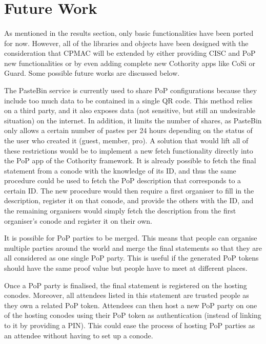\section{Future Work}

\paragraph{}
As mentioned in the results section, only basic functionalities have been ported for now. However, all of the libraries and objects have been designed with the consideration that CPMAC will be extended by either providing CISC and PoP new functionalities or by even adding complete new Cothority apps like CoSi or Guard. Some possible future works are discussed below.

\begin{description}[style=nextline]
\item[Replacing PasteBin] The PasteBin service is currently used to share PoP configurations because they include too much data to be contained in a single QR code. This method relies on a third party, and it also exposes data (not sensitive, but still an undesirable situation) on the internet. In addition, it limits the number of shares, as PasteBin only allows a certain number of pastes per 24 hours depending on the status of the user who created it (guest, member, pro). A solution that would lift all of these restrictions would be to implement a new fetch functionality directly into the PoP app of the Cothority framework. It is already possible to fetch the final statement from a conode with the knowledge of its ID, and thus the same procedure could be used to fetch the PoP description that corresponds to a certain ID. The new procedure would then require a first organiser to fill in the description, register it on that conode, and provide the others with the ID, and the remaining organisers would simply fetch the description from the first organiser’s conode and register it on their own.

\item[PoP Party Merging] It is possible for PoP parties to be merged. This means that people can organise multiple parties around the world and merge the final statements so that they are all considered as one single PoP party. This is useful if the generated PoP tokens should have the same proof value but people have to meet at different places.

\item[Viral PoP Parties] Once a PoP party is finalised, the final statement is registered on the hosting conodes. Moreover, all attendees listed in this statement are trusted people as they own a related PoP token. Attendees can then host a new PoP party on one of the hosting conodes using their PoP token as authentication (instead of linking to it by providing a PIN). This could ease the process of hosting PoP parties as an attendee without having to set up a conode.


\end{description}
